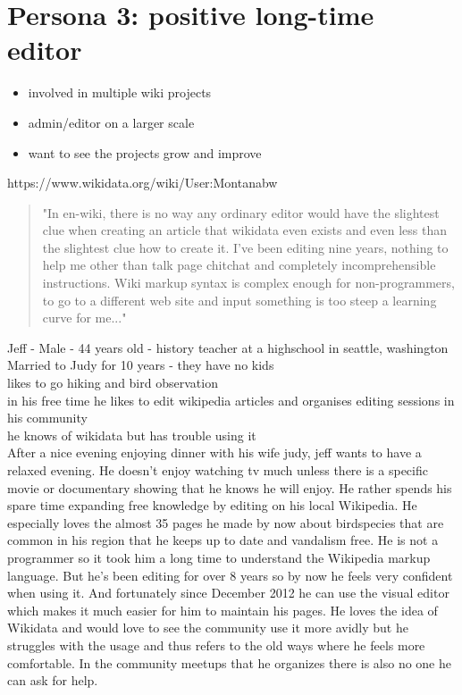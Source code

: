 \documentclass{article}
\begin{document}
\pagebreak

\section{Persona 3: positive long-time editor}

\begin{itemize}
\item involved in multiple wiki projects
\item admin/editor on a larger scale
\item want to see the projects grow and improve 
\end{itemize}

https://www.wikidata.org/wiki/User:Montanabw
\begin{quote}
"In en-wiki, there is no way any ordinary editor would have the slightest clue when creating an article that wikidata even exists and even less than the slightest clue how to create it. I've been editing nine years, nothing to help me other than talk page chitchat and completely incomprehensible instructions. Wiki markup syntax is complex enough for non-programmers, to go to a different web site and input something is too steep a learning curve for me..."
\end{quote}

\noindent
Jeff - Male - 44 years old - history teacher at a highschool in seattle, washington \\
Married to Judy for 10 years - they have no kids \\
likes to go hiking and bird observation \\
in his free time he likes to edit wikipedia articles and organises editing sessions in his community \\
he knows of wikidata but has trouble using it \\

After a nice evening enjoying dinner with his wife judy, jeff wants to have a relaxed evening. He doesn't enjoy watching tv much unless there is a specific movie or documentary showing that he knows he will enjoy. He rather spends his spare time expanding free knowledge by editing on his local Wikipedia. He especially loves the almost 35 pages he made by now about birdspecies that are common in his region that he keeps up to date and vandalism free. He is not a programmer so it took him a long time to understand the Wikipedia markup language. But he's been editing for over 8 years so by now he feels very confident when using it. And fortunately since December 2012 he can use the visual editor which makes it much easier for him to maintain his pages. He loves the idea of Wikidata and would love to see the community use it more avidly but he struggles with the usage and thus refers to the old ways where he feels more comfortable. In the community meetups that he organizes there is also no one he can ask for help. 
\end{document}
